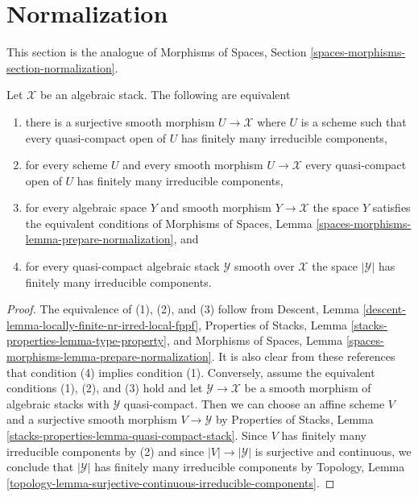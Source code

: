 \section{Normalization}
\label{section-normalization}

\noindent
This section is the analogue of
Morphisms of Spaces, Section \ref{spaces-morphisms-section-normalization}.

\begin{lemma}
\label{lemma-prepare-normalization}
Let $\mathcal{X}$ be an algebraic stack. The following are equivalent
\begin{enumerate}
\item there is a surjective smooth morphism $U \to \mathcal{X}$ where $U$
is a scheme such that every quasi-compact open of $U$ has
finitely many irreducible components,
\item for every scheme $U$ and every smooth morphism
$U \to \mathcal{X}$ every quasi-compact open of $U$ has finitely many
irreducible components,
\item for every algebraic space $Y$ and smooth morphism $Y \to \mathcal{X}$
the space $Y$ satisfies the equivalent conditions of
Morphisms of Spaces, Lemma \ref{spaces-morphisms-lemma-prepare-normalization},
and
\item for every quasi-compact algebraic stack $\mathcal{Y}$ smooth over
$\mathcal{X}$ the space $|\mathcal{Y}|$ has finitely many irreducible
components.
\end{enumerate}
\end{lemma}

\begin{proof}
The equivalence of (1), (2), and (3) follow from
Descent, Lemma \ref{descent-lemma-locally-finite-nr-irred-local-fppf},
Properties of Stacks, Lemma \ref{stacks-properties-lemma-type-property}, and
Morphisms of Spaces, Lemma \ref{spaces-morphisms-lemma-prepare-normalization}.
It is also clear from these references that condition (4)
implies condition (1). Conversely, assume the equivalent conditions
(1), (2), and (3) hold and let $\mathcal{Y} \to \mathcal{X}$ be a
smooth morphism of algebraic stacks with $\mathcal{Y}$
quasi-compact. Then we can choose an affine scheme $V$ and a surjective
smooth morphism $V \to \mathcal{Y}$ by Properties of Stacks, Lemma
\ref{stacks-properties-lemma-quasi-compact-stack}.
Since $V$ has finitely many irreducible components by (2) and since
$|V| \to |\mathcal{Y}|$ is surjective and continuous, we conclude that
$|\mathcal{Y}|$ has finitely many irreducible components by Topology, Lemma
\ref{topology-lemma-surjective-continuous-irreducible-components}.
\end{proof}

